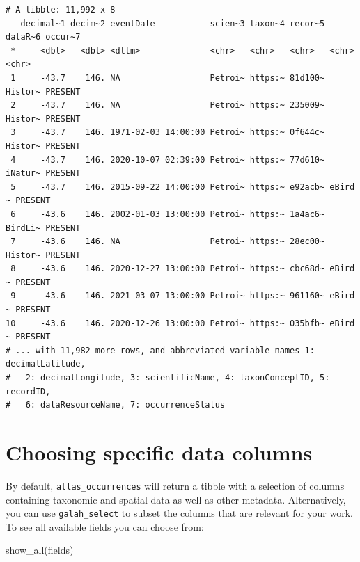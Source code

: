 \documentclass[
  letterpaper,
  DIV=11,
  numbers=noendperiod,
  oneside]{scrreprt}
\newenvironment{Shaded}{\begin{snugshade}}{\end{snugshade}}
\newcommand{\FunctionTok}[1]{\textcolor[rgb]{0.28,0.35,0.67}{#1}}
\newcommand{\NormalTok}[1]{\textcolor[rgb]{0.00,0.23,0.31}{#1}}
\begin{document}
\begin{verbatim}
# A tibble: 11,992 x 8
   decimal~1 decim~2 eventDate           scien~3 taxon~4 recor~5 dataR~6 occur~7
 *     <dbl>   <dbl> <dttm>              <chr>   <chr>   <chr>   <chr>   <chr>  
 1     -43.7    146. NA                  Petroi~ https:~ 81d100~ Histor~ PRESENT
 2     -43.7    146. NA                  Petroi~ https:~ 235009~ Histor~ PRESENT
 3     -43.7    146. 1971-02-03 14:00:00 Petroi~ https:~ 0f644c~ Histor~ PRESENT
 4     -43.7    146. 2020-10-07 02:39:00 Petroi~ https:~ 77d610~ iNatur~ PRESENT
 5     -43.7    146. 2015-09-22 14:00:00 Petroi~ https:~ e92acb~ eBird ~ PRESENT
 6     -43.6    146. 2002-01-03 13:00:00 Petroi~ https:~ 1a4ac6~ BirdLi~ PRESENT
 7     -43.6    146. NA                  Petroi~ https:~ 28ec00~ Histor~ PRESENT
 8     -43.6    146. 2020-12-27 13:00:00 Petroi~ https:~ cbc68d~ eBird ~ PRESENT
 9     -43.6    146. 2021-03-07 13:00:00 Petroi~ https:~ 961160~ eBird ~ PRESENT
10     -43.6    146. 2020-12-26 13:00:00 Petroi~ https:~ 035bfb~ eBird ~ PRESENT
# ... with 11,982 more rows, and abbreviated variable names 1: decimalLatitude,
#   2: decimalLongitude, 3: scientificName, 4: taxonConceptID, 5: recordID,
#   6: dataResourceName, 7: occurrenceStatus
\end{verbatim}

\hypertarget{choosing-specific-data-columns}{%
\section{Choosing specific data
columns}\label{choosing-specific-data-columns}}

By default, \texttt{atlas\_occurrences} will return a tibble with a
selection of columns containing taxonomic and spatial data as well as
other metadata. Alternatively, you can use \texttt{galah\_select} to
subset the columns that are relevant for your work. To see all available
fields you can choose from:

\begin{Shaded}
\begin{Highlighting}[]
\FunctionTok{show\_all}\NormalTok{(fields) }
\end{Highlighting}
\end{Shaded}
\end{document}
